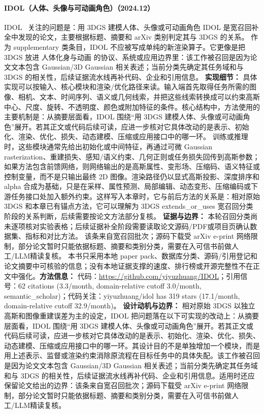 \paragraph{IDOL（人体、头像与可动画角色）（2024.12）}
IDOL~\cite{2412_14963} 关注的问题是：用 3DGS 建模人体、头像或可动画角色 IDOL 是宽召回补全中发现的论文，主要根据标题、摘要和 arXiv 类别判定其与 3DGS 的关系。
作为 supplementary 类条目，IDOL 不应被写成单纯的新渲染算子。它更像是把 3DGS 放进 人体化身与动画 的协议、系统或应用边界里：该工作被召回是因为论文文本包含 Gaussian/3D Gaussian 相关表述；当前分类先确定其任务域和与 3DGS 的相关性，后续证据流水线再补代码、企业和引用信息。
\textbf{实现细节：} 具体实现可以按输入、核心模块和渲染/优化路径来读。输入端首先取得任务所需的图像、相机、文本、时间序列、语义或几何线索，并把这些线索转换成可以约束高斯中心、尺度、旋转、不透明度、颜色或附加特征的条件。核心结构中，方法使用的主要机制是：从摘要层面看，IDOL 围绕“用 3DGS 建模人体、头像或可动画角色”展开。若其正文或代码后续可读，应进一步核对它具体改动的是表示、初始化、渲染、优化、损失、动态建模、压缩或应用接口中的哪一环。 训练或推理时，这些模块通常先给出初始化或中间特征，再通过可微 Gaussian rasterization、重建损失、感知/语义约束、几何正则或任务损失回传到高斯参数；如果方法包含前馈网络，则网络输出的是高斯属性、变形场、压缩码、语义特征或控制变量，而不是只输出最终 2D 图像。渲染路径仍以显式高斯投影、深度排序和 alpha 合成为基础，只是在采样、属性预测、局部编辑、动态变形、压缩编码或下游任务接口处加入额外约束。这样写入本章时，它与前后方法的关系是：相对原始 3DGS 和本章已有锚点方法，它可以理解为 3DGS extends\_or\_uses 宽召回分类阶段的关系判断，后续需要按论文方法部分复核。
\textbf{证据与边界：} 本轮召回分类尚未逐项核对实验表格；后续证据补全阶段需要读取论文源码/PDF或项目页确认数据集、指标和对比方法。 该条来自宽召回批次；源码下载受 arXiv e-print 网络限制，部分论文暂时只能依据标题、摘要和类别分类，需要在入可信书前做人工/LLM精读复核。 本书只采用本地 paper pack、数据库分类、源码/引用登记和论文摘要中可核验的信息；没有本地证据支撑的速度、排行榜或开源完整性不在正文中强化。\textbf{方法信息：} 代码：\url{https://github.com/yiyuzhuang/IDOL}；引用信号：62 citations (3.3/month, domain-relative cutoff 3.0/month, semantic\_scholar)；代码关注：yiyuzhuang/idol has 319 stars (17.1/month, domain-relative cutoff 32.9/month)。
\textbf{设计动机与边界：} 相对原始 3DGS 以独立高斯和图像重建误差为主的设定，IDOL 把问题落在以下可实现的改动上：从摘要层面看，IDOL 围绕“用 3DGS 建模人体、头像或可动画角色”展开。若其正文或代码后续可读，应进一步核对它具体改动的是表示、初始化、渲染、优化、损失、动态建模、压缩或应用接口中的哪一环。其设计目的不是单独增加一个模块，而是用上述表示、监督或渲染约束消除原流程在目标任务中的具体失配。该工作被召回是因为论文文本包含 Gaussian/3D Gaussian 相关表述；当前分类先确定其任务域和与 3DGS 的相关性，后续证据流水线再补代码、企业和引用信息。适用时还应保留论文给出的边界：该条来自宽召回批次；源码下载受 arXiv e-print 网络限制，部分论文暂时只能依据标题、摘要和类别分类，需要在入可信书前做人工/LLM精读复核。
